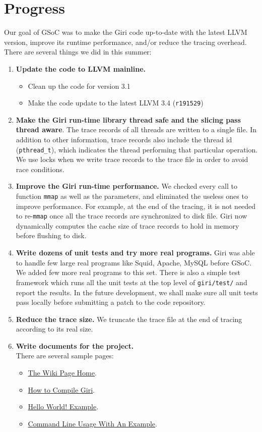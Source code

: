 \documentclass[DIV=calc, paper=a4, fontsize=11pt, twocolumn]{scrartcl}
\begin{document}
\section{Progress}
\label{sec:progress}
Our goal of GSoC was to make the Giri code up-to-date with the latest LLVM version, improve its runtime performance, and/or reduce the tracing overhead.
There are several things we did in this summer:
\begin{enumerate}
	\item \textbf{Update the code to LLVM mainline.}
		\begin{itemize}
			\item Clean up the code for version 3.1
			\item Make the code update to the latest LLVM 3.4 (\texttt{r191529})
		\end{itemize}
	\item \textbf{Make the Giri run-time library thread safe and the slicing pass thread aware}.
		The trace records of all threads are written to a single file.
		In addition to other information, trace records also include the thread id (\texttt{pthread\_t}),
		which indicates the thread performing that particular operation.
		We use locks when we write trace records to the trace file in order to avoid race conditions.
	\item \textbf{Improve the Giri run-time performance.}
		We checked every call to function \texttt{mmap} as well as the parameters, and eliminated the useless ones to improve performance.
		For example, at the end of the tracing, it is not needed to re-\texttt{mmap} once all the trace records are synchronized to disk file.
		Giri now dynamically computes the cache size of trace records to hold in memory before flushing to disk.
	\item \textbf{Write dozens of unit tests and try more real programs.}
		Giri was able to handle few large real programs like Squid, Apache, MySQL before GSoC.
		We added few more real programs to this set.
		There is also a simple test framework which runs all the unit tests at the top level of \texttt{giri/test/} and report the results.
		In the future development, we shall make sure all unit tests pass locally before submitting a patch to the code repository.
	\item \textbf{Reduce the trace size.}
		We truncate the trace file at the end of tracing according to its real size.
	\item \textbf{Write documents for the project.}\\
		There are several sample pages:
		\begin{itemize}
			\item \href{https://github.com/liuml07/giri/wiki}{The Wiki Page Home}.
			\item \href{https://github.com/liuml07/giri/wiki/How-to-Compile-Giri}{How to Compile Giri}.
			\item \href{https://github.com/liuml07/giri/wiki/Hello-World}{Hello World! Example}.
			\item \href{https://github.com/liuml07/giri/wiki/Example-Usage}{Command Line Usage With An Example}.
		\end{itemize}
\end{enumerate}
\end{document}
